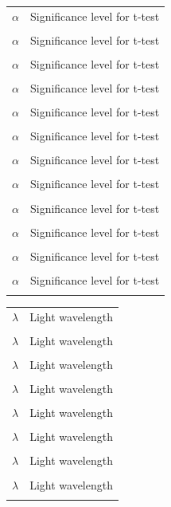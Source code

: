 {\begin{table}[H]
\begin{tabular}{ m{2.2cm}  m{12cm} }
	$\alpha$ & Significance level for t-test \\ \\
	$\alpha$ & Significance level for t-test \\ \\
	$\alpha$ & Significance level for t-test \\ \\
	$\alpha$ & Significance level for t-test \\ \\
	$\alpha$ & Significance level for t-test \\ \\
	$\alpha$ & Significance level for t-test \\ \\
	$\alpha$ & Significance level for t-test \\ \\
	$\alpha$ & Significance level for t-test \\ \\ 
	$\alpha$ & Significance level for t-test \\ \\
	$\alpha$ & Significance level for t-test \\ \\
	$\alpha$ & Significance level for t-test \\ \\
	$\alpha$ & Significance level for t-test \\ \\
\end{tabular} 
\end{table}
\begin{table}[H]
\begin{tabular}{ m{2.2cm}  m{12cm} }
	$\lambda$ & Light wavelength \\ \\ 
	$\lambda$ & Light wavelength \\ \\ 
	$\lambda$ & Light wavelength \\ \\ 
	$\lambda$ & Light wavelength \\ \\ 
	$\lambda$ & Light wavelength \\ \\ 
	$\lambda$ & Light wavelength \\ \\ 
	$\lambda$ & Light wavelength \\ \\ 
	$\lambda$ & Light wavelength \\ \\ 
\end{tabular} 
\end{table}}
